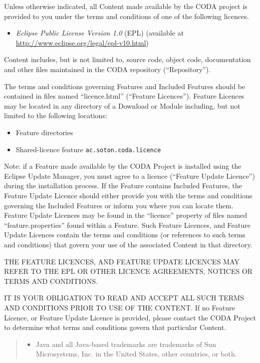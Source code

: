 Unless otherwise indicated, all Content made available by the CODA
project is provided to you under the terms and conditions of one of
the following licences.

\begin{itemize}
\item \emph{Eclipse Public License Version 1.0} (EPL) (available at 
   \url{http://www.eclipse.org/legal/epl-v10.html})
\end{itemize}

Content includes, but is not limited to, source code, object code,
documentation and other files maintained in the CODA repository (``Repository'').

The terms and conditions governing Features and Included Features
should be contained in files named ``licence.html'' (``Feature
Licences'').  Feature Licences may be located in any directory of a
Download or Module including, but not limited to the following
locations:

\begin{itemize}
\item Feature directories

\item Shared-licence feature \texttt{ac.soton.coda.licence}
\end{itemize}

Note: if a Feature made available by the CODA Project is
installed using the Eclipse Update Manager, you must agree to a
licence (``Feature Update Licence'') during the installation process.
If the Feature contains Included Features, the Feature Update
Licence should either provide you with the terms and conditions
governing the Included Features or inform you where you can locate
them.  Feature Update Licences may be found in the ``licence''
property of files named ``feature.properties'' found within a
Feature.  Such Feature Licences, and Feature Update
Licences contain the terms and conditions (or references to such
terms and conditions) that govern your use of the associated
Content in that directory.

THE FEATURE LICENCES, AND FEATURE UPDATE LICENCES MAY REFER
TO THE EPL OR OTHER LICENCE AGREEMENTS, NOTICES OR TERMS AND
CONDITIONS.

IT IS YOUR OBLIGATION TO READ AND ACCEPT ALL SUCH TERMS AND
CONDITIONS PRIOR TO USE OF THE CONTENT.  If no Feature
Licence, or Feature Update Licence is provided, please contact the
CODA Project to determine what terms and conditions govern
that particular Content.
\begin{quote}
  \footnotesize

  \begin{itemize}
  \item  Java and all Java-based trademarks are trademarks of Sun
    Microsystems, Inc. in the United States, other countries, or
    both.
  \end{itemize}
\end{quote}

